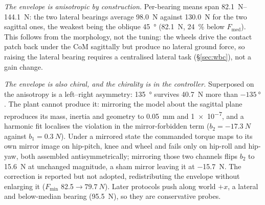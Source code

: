 \documentclass{jcd}
\begin{document}
\emph{The envelope is anisotropic by construction.} Per-bearing means span
\SIrange{82.1}{144.1}{N}: the two lateral bearings average \SI{98.0}{N} against
\SI{130.0}{N} for the two sagittal ones, the weakest being the oblique
\SI{45}{\degree} (\SI{82.1}{N}, \SI{24}{\percent} below $F_{\text{med}}$). This
follows from the morphology, not the tuning: the wheels drive the contact patch
back under the CoM sagittally but produce no lateral ground force, so raising the
lateral bearing requires a centralised lateral task (\S\ref{sec:wbc}), not a gain
change.

\emph{The envelope is also chiral, and the chirality is in the controller.}
Superposed on the anisotropy is a left--right asymmetry: \SI{135}{\degree}
survives \SI{40.7}{N} more than $-\SI{135}{\degree}$. The plant cannot produce it: mirroring the model about the sagittal plane reproduces its mass, inertia
and geometry to \SI{0.05}{mm} and \num{1e-7}, and a harmonic fit localises the
violation in the mirror-forbidden term ($b_2{=}\SI{-17.3}{N}$ against
$b_1{=}\SI{0.3}{N}$). Under a mirrored state the commanded torque maps to its own
mirror image on hip-pitch, knee and wheel and fails only on hip-roll and hip-yaw,
both assembled antisymmetrically; mirroring those two channels flips $b_2$ to
\SI{+15.6}{N} at unchanged magnitude, a sham mirror leaving it at \SI{-15.7}{N}.
The correction is reported but not adopted, redistributing the envelope without
enlarging it ($F_{\min}$ \SI{82.5}{}${\rightarrow}\SI{79.7}{N}$). Later protocols
push along world $+x$, a lateral and below-median bearing (\SI{95.5}{N}), so they
are conservative probes.
\end{document}
